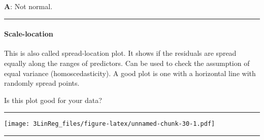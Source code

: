 \documentclass[]{article}
\newenvironment{Shaded}{\begin{snugshade}}{\end{snugshade}}
\newcommand{\DataTypeTok}[1]{\textcolor[rgb]{0.13,0.29,0.53}{#1}}
\newcommand{\FloatTok}[1]{\textcolor[rgb]{0.00,0.00,0.81}{#1}}
\newcommand{\KeywordTok}[1]{\textcolor[rgb]{0.13,0.29,0.53}{\textbf{#1}}}
\newcommand{\NormalTok}[1]{#1}
\newcommand{\OperatorTok}[1]{\textcolor[rgb]{0.81,0.36,0.00}{\textbf{#1}}}
\newcommand{\OtherTok}[1]{\textcolor[rgb]{0.56,0.35,0.01}{#1}}
\newcommand{\StringTok}[1]{\textcolor[rgb]{0.31,0.60,0.02}{#1}}
\let\oldparagraph\paragraph
\renewcommand{\paragraph}[1]{\oldparagraph{#1}\mbox{}}
\begin{document}
\textbf{A}: Not normal.

\begin{center}\rule{0.5\linewidth}{\linethickness}\end{center}

\hypertarget{scale-location}{%
\paragraph{Scale-location}\label{scale-location}}

This is also called spread-location plot. It shows if the residuals are
spread equally along the ranges of predictors. Can be used to check the
assumption of equal variance (homoscedasticity). A good plot is one with
a horizontal line with randomly spread points.

Is this plot good for your data?

\begin{center}\rule{0.5\linewidth}{\linethickness}\end{center}

\footnotesize

\begin{Shaded}
\end{Shaded}

\texttt{[image: 3LinReg\_files/figure-latex/unnamed-chunk-30-1.pdf]}
\normalsize

\begin{center}\rule{0.5\linewidth}{\linethickness}\end{center}
\end{document}
